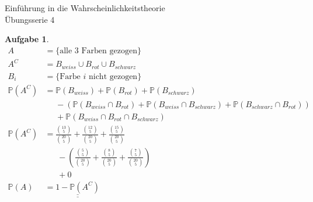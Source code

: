 \documentclass[11pt]{article}
\theoremstyle{break}
\newtheorem{task}{Aufgabe}
\begin{document}
\begin{center}
\Large{Einführung in die Wahrscheinlichkeitstheorie}\\
\large{Übungsserie 4}
\end{center}
\setcounter{task}{2}
\begin{task}
\hfill\vspace{-5mm}
\begin{align*}
A &= \{\text{alle 3 Farben gezogen}\}\\
A^C &= B_{weiss} \cup B_{rot} \cup B_{schwarz}\\
B_i &= \{\text{Farbe }i\text{ nicht gezogen}\}\\
\mathbb{P}(A^C) &=
 \mathbb{P}(B_{weiss}) + \mathbb{P}(B_{rot}) + \mathbb{P}(B_{schwarz})\\
&\phantom{=}  - (\mathbb{P}(B_{weiss}\cap B_{rot}) + \mathbb{P}(B_{weiss}\cap B_{schwarz}) + \mathbb{P}(B_{schwarz}\cap B_{rot}))\\
&\phantom{=} + \mathbb{P}(B_{weiss} \cap B_{rot} \cap B_{schwarz})\\
\mathbb{P}(A^C) &= \frac{\binom{13}{5}}{\binom{20}{5}} + \frac{\binom{12}{5}}{\binom{20}{5}} + \frac{\binom{15}{5}}{\binom{20}{5}}\\
&\phantom{=}\ - \left(\frac{\binom{5}{5}}{\binom{20}{5}} + \frac{\binom{8}{5}}{\binom{20}{5}} + \frac{\binom{7}{5}}{\binom{20}{5}}\right)\\
&\phantom{=}\ + 0\\
\mathbb{P}(A) &= \underline{\underline{1-\mathbb{P}(A^C)}}
\end{align*}
\end{task}
\setcounter{task}{4}
\end{document}
